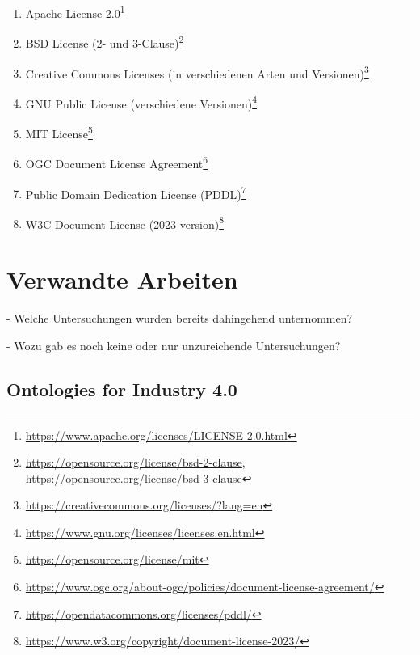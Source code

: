\documentclass{article}
\begin{document}
\begin{enumerate}
    \item Apache License 2.0\footnote{\url{https://www.apache.org/licenses/LICENSE-2.0.html}}
    \item BSD License (2- und 3-Clause)\footnote{\url{https://opensource.org/license/bsd-2-clause}, \url{https://opensource.org/license/bsd-3-clause}}
    \item Creative Commons Licenses (in verschiedenen Arten und Versionen)\footnote{\url{https://creativecommons.org/licenses/?lang=en}}
    \item GNU Public License (verschiedene Versionen)\footnote{\url{https://www.gnu.org/licenses/licenses.en.html}}
    \item MIT License\footnote{\url{https://opensource.org/license/mit}}
    \item OGC Document License Agreement\footnote{\url{https://www.ogc.org/about-ogc/policies/document-license-agreement/}}
    \item Public Domain Dedication License (PDDL)\footnote{\url{https://opendatacommons.org/licenses/pddl/}}
    \item W3C Document License (2023 version)\footnote{\url{https://www.w3.org/copyright/document-license-2023/}}
\end{enumerate}


\section{Verwandte Arbeiten}

- Welche Untersuchungen wurden bereits dahingehend unternommen?

- Wozu gab es noch keine oder nur unzureichende Untersuchungen?

\subsection{Ontologies for Industry 4.0}
%
\end{document}
